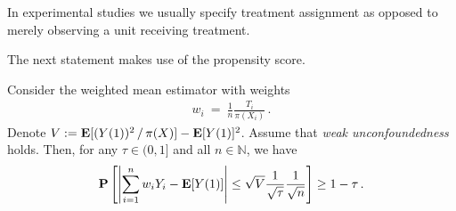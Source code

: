 In experimental studies we usually specify treatment assignment as opposed to merely observing a unit receiving treatment. 

The next statement makes use of the propensity score.

\begin{theorem*}
  Consider the weighted mean estimator with weights
  \begin{gather}
    w_i
    \ 
    =
    \ 
    \frac{1}{n}
    \frac{T_i}{\pi(X_i)}
    \,.
  \end{gather}
  Denote
  $
    V:=
    \mathbf{E}[
    (
      Y(1)
    )^2
    \,/\,
    \pi(X)
    ]
    -
    \mathbf{E}[Y(1)]^2
  $.  
  Assume that \textit{weak unconfoundedness} holds.
  Then, for any $\tau \in (0,1]$ and all $n\in\mathbb{N}$, we have
  \begin{gather}
   \mathbf{P}
   \left[
     \left| 
   \sum_{i=1}^{n}
   w_iY_i - \mathbf{E}[Y(1)]
     \right|
     \le
     \sqrt{V}
     \frac{1}{\sqrt{\tau}}
     \frac{1}{\sqrt{n}}
   \right]
   \ge
   1-\tau\,.
  \end{gather}

\end{theorem*}
